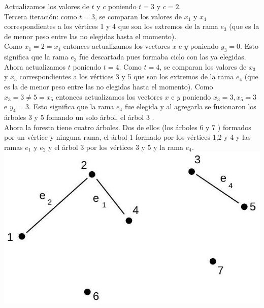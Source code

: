 \documentclass[10pt]{article}
\begin{document}
Actualizamos los valores de $t$ y $c$ poniendo $t=3$ y $c=2$.\\
Tercera iteración: como $t=3$, se comparan los valores de $x_{1}$ y $x_{4}$ correspondientes a los vértices 1 y 4 que son los extremos de la rama $e_{3}$ (que es la de menor peso entre las no elegidas hasta el momento).\\
Como $x_{1}=2=x_{4}$ entonces actualizamos los vectores $x$ e $y$ poniendo $y_{3}=0$. Esto significa que la rama $e_{3}$ fue descartada pues formaba ciclo con las ya elegidas. Ahora actualizamos $t$ poniendo $t=4$. Como $t=4$, se comparan los valores de $x_{3}$ y $x_{5}$ correspondientes a los vértices 3 y 5 que son los extremos de la rama $e_{4}$ (que es la de menor peso entre las no elegidas hasta el momento). Como $x_{3}=3 \neq 5=x_{5}$ entonces actualizamos los vectores $x$ e $y$ poniendo $x_{3}=3, x_{5}=3$ e $y_{4}=3$. Esto significa que la rama $e_{4}$ fue elegida y al agregarla se fusionaron los árboles 3 y 5 fomando un solo árbol, el árbol 3 .\\
Ahora la foresta tiene cuatro árboles. Dos de ellos (los árboles 6 y 7 ) formados por un vértice y ninguna rama, el árbol 1 formado por los vértices 1,2 y 4 y las ramas $e_{1}$ y $e_{2}$ y el árbol 3 por los vértices 3 y 5 y la rama $e_{4}$.\\
\includegraphics[max width=\textwidth, center]{2025_09_05_93c7c1835f249f70c0eeg-24(1)}
\end{document}
